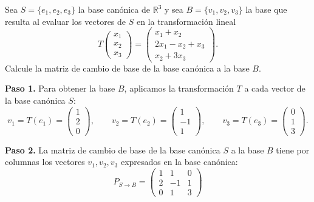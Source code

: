 
\begin{prob}
Sea $S = \{e_1, e_2, e_3\}$ la base canónica de $\mathbb{R}^3$ y sea $B = \{v_1, v_2, v_3\}$ la base que resulta al evaluar los vectores de $S$ en la transformación lineal
\[
T\begin{pmatrix} x_1 \\ x_2 \\ x_3 \end{pmatrix} = \begin{pmatrix} x_1 + x_2 \\ 2x_1 - x_2 + x_3 \\ x_2 + 3x_3 \end{pmatrix}.
\]
Calcule la matriz de cambio de base de la base canónica a la base $B$.
\begin{myproof}
\textbf{Paso 1.} Para obtener la base $B$, aplicamos la transformación $T$ a cada vector de la base canónica $S$:
\[
v_1 = T(e_1) = \begin{pmatrix}1 \\ 2 \\ 0 \end{pmatrix}, \qquad
v_2 = T(e_2) = \begin{pmatrix}1 \\ -1 \\ 1 \end{pmatrix}, \qquad
v_3 = T(e_3) = \begin{pmatrix}0 \\ 1 \\ 3 \end{pmatrix}.
\]

\textbf{Paso 2.} La matriz de cambio de base de la base canónica $S$ a la base $B$ tiene por columnas los vectores $v_1, v_2, v_3$ expresados en la base canónica:
\[
\boxed{P_{S \to B} = \begin{pmatrix}
1 & 1 & 0 \\
2 & -1 & 1 \\
0 & 1 & 3
\end{pmatrix}}
\]
\end{myproof}
\end{prob}

